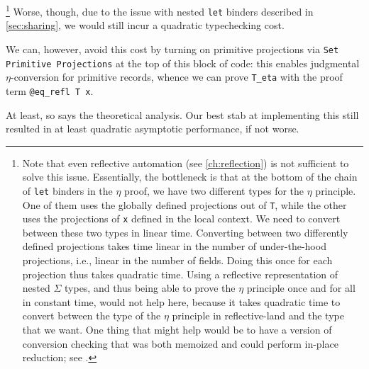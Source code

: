   \footnote{%
      Note that even reflective automation (see \autoref{ch:reflection}) is not sufficient to solve this issue.
      Essentially, the bottleneck is that at the bottom of the chain of \texttt{let} binders in the $\eta$ proof, we have two different types for the $\eta$ principle.
      One of them uses the globally defined projections out of \texttt{T}, while the other uses the projections of \texttt{x} defined in the local context.
      We need to convert between these two types in linear time.
      Converting between two differently defined projections takes time linear in the number of under-the-hood projections, i.e., linear in the number of fields.
      Doing this once for each projection thus takes quadratic time.
      Using a reflective representation of nested $\Sigma$ types, and thus being able to prove the $\eta$ principle once and for all in constant time, would not help here, because it takes quadratic time to convert between the type of the $\eta$ principle in reflective-land and the type that we want.
      One thing that might help would be to have a version of conversion checking that was both memoized and could perform in-place reduction; see .%
  }
  Worse, though, due to the issue with nested \texttt{let} binders described in \autoref{sec:sharing}, we would still incur a quadratic typechecking cost.

  We can, however, avoid this cost by turning on primitive projections via \texttt{Set Primitive Projections} at the top of this block of code:
  this enables judgmental $\eta$-conversion for primitive records, whence we can prove \texttt{T_eta} with the proof term \texttt{@eq_refl T x}.

  At least, so says the theoretical analysis.
  Our best stab at implementing this still resulted in at least quadratic asymptotic performance, if not worse.

